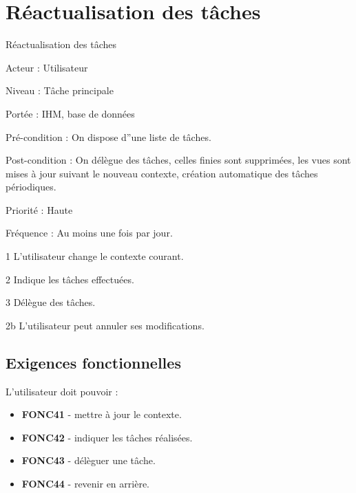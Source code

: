\section{Réactualisation des tâches}
	\begin{usecase}{Réactualisation des tâches} 
		\begin{information}
			\item[Acteur :] Utilisateur
			\item[Niveau :] Tâche principale
			\item[Portée :] IHM, base de données
			\item[Pré-condition :] On dispose d''une liste de tâches.
			\item[Post-condition :] On délègue des tâches, celles finies sont supprimées, les vues sont mises à jour suivant le nouveau contexte, création automatique des tâches périodiques.
			\item[Priorité :] Haute
			\item[Fréquence :] Au moins une fois par jour.
		\end{information}
		\begin{scenario}
			\item[1] L'utilisateur change le contexte courant.
			\item[2] Indique les tâches effectuées.
			\item[3] Délègue des tâches.
		\end{scenario}
		\begin{extension}
			\item[2b] L'utilisateur peut annuler ses modifications.
		\end{extension}
	\end{usecase}
		
	
	\subsection{Exigences fonctionnelles}
		L'utilisateur doit pouvoir :
		\begin{itemize}	\renewcommand{\labelitemi}{}
			\item \textbf{FONC41} - mettre à jour le contexte.
			\item \textbf{FONC42} - indiquer les tâches réalisées.
			\item \textbf{FONC43} - délèguer une tâche.
			\item \textbf{FONC44} - revenir en arrière.
		\end{itemize}
		
